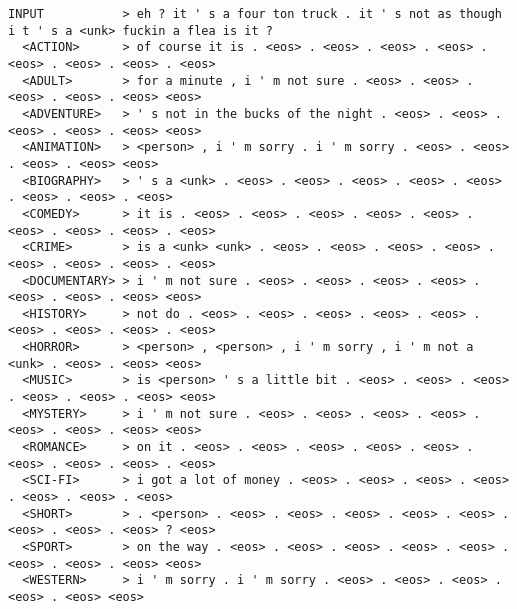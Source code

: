\begin{scriptsize}
\begin{verbatim}
INPUT           > eh ? it ' s a four ton truck . it ' s not as though i t ' s a <unk> fuckin a flea is it ?
  <ACTION>      > of course it is . <eos> . <eos> . <eos> . <eos> . <eos> . <eos> . <eos> . <eos>
  <ADULT>       > for a minute , i ' m not sure . <eos> . <eos> . <eos> . <eos> . <eos> <eos>
  <ADVENTURE>   > ' s not in the bucks of the night . <eos> . <eos> . <eos> . <eos> . <eos> <eos>
  <ANIMATION>   > <person> , i ' m sorry . i ' m sorry . <eos> . <eos> . <eos> . <eos> <eos>
  <BIOGRAPHY>   > ' s a <unk> . <eos> . <eos> . <eos> . <eos> . <eos> . <eos> . <eos> . <eos>
  <COMEDY>      > it is . <eos> . <eos> . <eos> . <eos> . <eos> . <eos> . <eos> . <eos> . <eos>
  <CRIME>       > is a <unk> <unk> . <eos> . <eos> . <eos> . <eos> . <eos> . <eos> . <eos> . <eos>
  <DOCUMENTARY> > i ' m not sure . <eos> . <eos> . <eos> . <eos> . <eos> . <eos> . <eos> <eos>
  <HISTORY>     > not do . <eos> . <eos> . <eos> . <eos> . <eos> . <eos> . <eos> . <eos> . <eos>
  <HORROR>      > <person> , <person> , i ' m sorry , i ' m not a <unk> . <eos> . <eos> <eos>
  <MUSIC>       > is <person> ' s a little bit . <eos> . <eos> . <eos> . <eos> . <eos> . <eos> <eos>
  <MYSTERY>     > i ' m not sure . <eos> . <eos> . <eos> . <eos> . <eos> . <eos> . <eos> <eos>
  <ROMANCE>     > on it . <eos> . <eos> . <eos> . <eos> . <eos> . <eos> . <eos> . <eos> . <eos>
  <SCI-FI>      > i got a lot of money . <eos> . <eos> . <eos> . <eos> . <eos> . <eos> . <eos>
  <SHORT>       > . <person> . <eos> . <eos> . <eos> . <eos> . <eos> . <eos> . <eos> . <eos> ? <eos>
  <SPORT>       > on the way . <eos> . <eos> . <eos> . <eos> . <eos> . <eos> . <eos> . <eos> <eos>
  <WESTERN>     > i ' m sorry . i ' m sorry . <eos> . <eos> . <eos> . <eos> . <eos> <eos>

\end{verbatim}
\end{scriptsize}

\newpage

